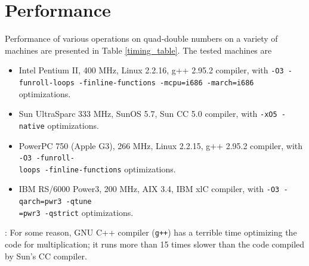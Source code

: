 \documentclass[11pt]{article}
\theoremstyle{definition}
\begin{document}
\section{Performance} \label{sec:performance}
Performance of various operations on quad-double numbers on a variety
of machines are presented in Table \ref{timing_table}.  The tested
machines are
\begin{itemize}
\item Intel Pentium II, 400 MHz, Linux 2.2.16, g++ 2.95.2 compiler, 
  with {\tt -O3 -funroll-loops -finline-functions -mcpu=i686 -march=i686} 
  optimizations.
\item Sun UltraSparc 333 MHz, SunOS 5.7, Sun CC 5.0 compiler, 
  with {\tt -xO5 -native} optimizations.
\item PowerPC 750 (Apple G3), 266 MHz, Linux 2.2.15, g++ 2.95.2 compiler, 
  with {\tt -O3 -funroll-\\loops -finline-functions} optimizations.
\item IBM RS/6000 Power3, 200 MHz, AIX 3.4, IBM xlC compiler, 
  with {\tt -O3 -qarch=pwr3 -qtune\\=pwr3 -qstrict} optimizations.
\end{itemize}

: For some reason, GNU C++ compiler ({\tt g++}) has
a terrible time optimizing the code for multiplication; it runs more than
15 times slower than the code compiled by Sun's CC compiler.
\end{document}
